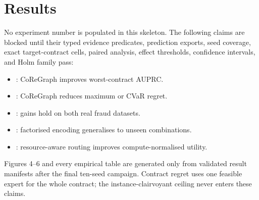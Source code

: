 \section{Results}

\tablepending

No experiment number is populated in this skeleton. The following claims are
blocked until their typed evidence predicates, prediction exports, seed
coverage, exact target-contract cells, paired analysis, effect thresholds,
confidence intervals, and Holm family pass:

\begin{itemize}
  \item \claimblocked: CoReGraph improves worst-contract AUPRC.
  \item \claimblocked: CoReGraph reduces maximum or CVaR regret.
  \item \claimblocked: gains hold on both real fraud datasets.
  \item \claimblocked: factorised encoding generalises to unseen combinations.
  \item \claimblocked: resource-aware routing improves compute-normalised utility.
\end{itemize}

Figures 4--6 and every empirical table are generated only from validated result
manifests after the final ten-seed campaign. Contract regret uses one feasible
expert for the whole contract; the instance-clairvoyant ceiling never enters
these claims.
